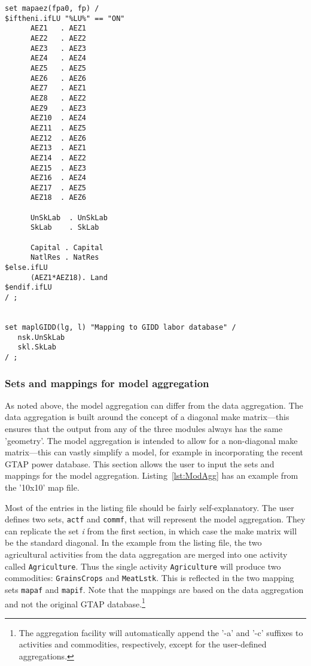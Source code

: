 \begin{lstlisting}[language=GAMS, caption={Standard mappings}, label=lst:StdMap]
set mapaez(fpa0, fp) /
$iftheni.ifLU "%LU%" == "ON"
      AEZ1   . AEZ1
      AEZ2   . AEZ2
      AEZ3   . AEZ3
      AEZ4   . AEZ4
      AEZ5   . AEZ5
      AEZ6   . AEZ6
      AEZ7   . AEZ1
      AEZ8   . AEZ2
      AEZ9   . AEZ3
      AEZ10  . AEZ4
      AEZ11  . AEZ5
      AEZ12  . AEZ6
      AEZ13  . AEZ1
      AEZ14  . AEZ2
      AEZ15  . AEZ3
      AEZ16  . AEZ4
      AEZ17  . AEZ5
      AEZ18  . AEZ6

      UnSkLab  . UnSkLab
      SkLab    . SkLab

      Capital . Capital
      NatlRes . NatRes
$else.ifLU
      (AEZ1*AEZ18). Land
$endif.ifLU
/ ;


set maplGIDD(lg, l) "Mapping to GIDD labor database" /
   nsk.UnSkLab
   skl.SkLab
/ ;
\end{lstlisting}

\subsubsection{Sets and mappings for model aggregation}

As noted above, the model aggregation can differ from the data aggregation. The
data aggregation is built around the concept of a diagonal make matrix---this
ensures that the output from any of the three modules always has the same
'geometry'. The model aggregation is intended to allow for a non-diagonal make
matrix---this can vastly simplify a model, for example in incorporating the
recent GTAP power database. This section allows the user to input the sets and
mappings for the model aggregation. Listing~\ref{lst:ModAgg} has an example from
the '10x10' map file.

Most of the entries in the listing file should be fairly self-explanatory. The
user defines two sets, \texttt{actf} and \texttt{commf}, that will represent the
model aggregation. They can replicate the set \emph{i} from the first section,
in which case the make matrix will be the standard diagonal. In the example from
the listing file, the two agricultural activities from the data aggregation are
merged into one activity called \texttt{Agriculture}. Thus the single activity
\texttt{Agriculture} will produce two commodities: \texttt{GrainsCrops} and
\texttt{MeatLstk}. This is reflected in the two mapping sets \texttt{mapaf} and
\texttt{mapif}. Note that the mappings are based on the data aggregation and not
the original GTAP database.\footnote{The aggregation facility will automatically
append the '-a' and '-c' suffixes to activities and commodities, respectively,
except for the user-defined aggregations.}

